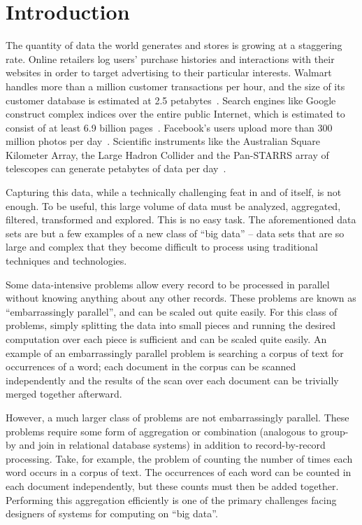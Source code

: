 \chapter{Introduction}

The quantity of data the world generates and stores is growing at a staggering
rate. Online retailers log users' purchase histories and interactions with
their websites in order to target advertising to their particular
interests. Walmart handles more than a million customer transactions per hour,
and the size of its customer database is estimated at 2.5
petabytes~\cite{economist-data-data-everywhere}. Search engines like Google
construct complex indices over the entire public Internet, which is estimated
to consist of at least 6.9 billion pages~\cite{worldwidewebsize}. Facebook's
users upload more than 300 million photos per
day~\cite{jay-parikh-slideshow}. Scientific instruments like the Australian
Square Kilometer Array, the Large Hadron Collider and the Pan-STARRS array of
telescopes can generate petabytes of data per day~\cite{fourth-paradigm}.

Capturing this data, while a technically challenging feat in and of itself, is
not enough. To be useful, this large volume of data must be analyzed,
aggregated, filtered, transformed and explored. This is no easy task. The
aforementioned data sets are but a few examples of a new class of ``big data''
-- data sets that are so large and complex that they become difficult to
process using traditional techniques and technologies.

Some data-intensive problems allow every record to be processed in parallel
without knowing anything about any other records. These problems are known as
``embarrassingly parallel'', and can be scaled out quite easily. For this class
of problems, simply splitting the data into small pieces and running the
desired computation over each piece is sufficient and can be scaled quite
easily. An example of an embarrassingly parallel problem is searching a corpus
of text for occurrences of a word; each document in the corpus can be scanned
independently and the results of the scan over each document can be trivially
merged together afterward.

However, a much larger class of problems are not embarrassingly parallel. These
problems require some form of aggregation or combination (analogous to group-by
and join in relational database systems) in addition to record-by-record
processing. Take, for example, the problem of counting the number of times each
word occurs in a corpus of text. The occurrences of each word can be counted in
each document independently, but these counts must then be added
together. Performing this aggregation efficiently is one of the primary
challenges facing designers of systems for computing on ``big data''.


